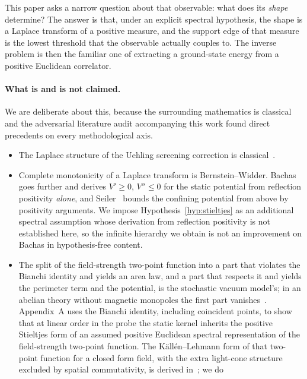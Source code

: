 \documentclass[11pt]{article}
\theoremstyle{definition}
\theoremstyle{remark}
\begin{document}
This paper asks a narrow question about that observable: what does its
\emph{shape} determine? The answer is that, under an explicit spectral
hypothesis, the shape is a Laplace transform of a positive measure, and the
support edge of that measure is the lowest threshold that the observable
actually couples to. The inverse problem is then the familiar one of extracting
a ground-state energy from a positive Euclidean correlator.

\paragraph{What is and is not claimed.}
We are deliberate about this, because the surrounding mathematics is classical
and the adversarial literature audit accompanying this work found direct
precedents on every methodological axis.
\begin{itemize}
\item The Laplace structure of the Uehling screening correction is
      classical~\cite{uehling_1935}.
\item Complete monotonicity of a Laplace transform is Bernstein--Widder.
      Bachas~\cite{bachas_1986} goes further and derives $V'\ge 0$,
      $V''\le 0$ for the static potential from reflection positivity
      \emph{alone}, and Seiler~\cite{seiler_1978} bounds the confining
      potential from above by positivity arguments. We impose
      Hypothesis~\ref{hyp:stieltjes} as an additional spectral assumption whose
      derivation from reflection positivity is not established here, so the
      infinite hierarchy we obtain is not an
      improvement on Bachas in hypothesis-free content.
\item The split of the field-strength two-point function into a part that
      violates the Bianchi identity and yields an area law, and a part that
      respects it and yields the perimeter term and the potential, is the
      stochastic vacuum model's; in an abelian theory without magnetic
      monopoles the first part vanishes~\cite{di_giacomo_dosch_shevchenko_simonov_2002}.
      Appendix~A uses the Bianchi identity, including coincident points, to
      show that at linear order in the probe the static kernel inherits the
      positive Stieltjes form of an assumed positive Euclidean spectral
      representation of the field-strength two-point function. The
      K\"all\'en--Lehmann form of that two-point function for a closed form
      field, with the extra light-cone structure excluded by spatial
      commutativity, is derived in~\cite{benedetti_casini_magan_2023}; we do

\end{itemize}
\end{document}
